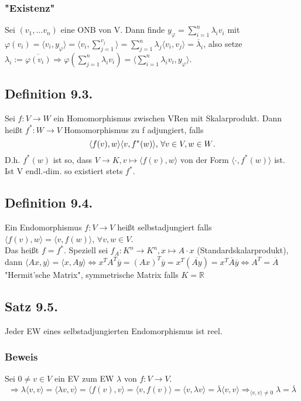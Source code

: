\documentclass[a4paper, 12pt]{extarticle}
\newcommand{\skalar}[2] {
	\langle #1, #2\rangle
}
\newcommand{\eskalar}[1]{
	\skalar{#1}{#1}
}
\newcommand{\gdw}{\Leftrightarrow}
\newcommand{\tn}[1]{\textnormal {#1}}
\begin{document}
\subsubsection*{"Existenz"}
Sei $(v_1,...v_n)$ eine ONB von V. Dann finde $y_\varphi=\sum_{i=1}^{n}\lambda_iv_i$ mit $\varphi(v_i)=\skalar{v_i}{y_\varphi} = \skalar{v_i}{\sum_{j=1}^{v_j}} = \sum_{j=1}^{n} \lambda_j \skalar{v_i}{v_j} = \overline\lambda_i$, also setze $\lambda_i := \overline{\varphi(v_i)} \Rightarrow \varphi(\sum_{j=1}^{n}\lambda_iv_i) = \skalar{\sum_{i=1}^{n}\lambda_iv_i}{y_\varphi}$.
\subsection*{Definition 9.3.}
Sei $f:V\to W$ ein Homomorphismus zwischen VRen mit Skalarprodukt. Dann heißt $f^*:W\to V$ Homomorphismus zu f adjungiert, falls 
$$\skalar{f(v)}{w} \skalar{v}{f^*(w)}\tn{, } \forall v\in V,w\in W\tn .$$
D.h. $f^*(w)$ ist so, dass $V\to K,v\mapsto \skalar{f(v)}{w}$ von der Form $\skalar{\cdot}{f^*(w)}$ ist. \\
Ist V endl.-dim. so existiert stets $f^*$.
\subsection*{Definition 9.4.}
Ein Endomorphismus $f:V\to V$ heißt selbstadjungiert falls $\skalar{f(v)}{w} = \skalar{v}{f(w)}$, $\forall v,w\in V$. \\
Das heißt $f=f^*$. Speziell sei $f_A:K^n\to K^n,x\mapsto A\cdot x$ (Standardskalarprodukt), dann $\skalar{Ax}{y} = \skalar{x}{Ay} \gdw x^TA^T\overline y = (Ax)^T\overline y = x^T(\overline{Ay}) = x^T\overline A\overline y \gdw A^T = \overline A$ "Hermit'sche Matrix", symmetrische Matrix falls $K=\mathbb R$
\subsection*{Satz 9.5.}
Jeder EW eines selbstadjungierten Endomorphismus ist reel.
\subsubsection*{Beweis}
Sei $0\neq v\in V$ ein EV zum EW $\lambda$ von $f:V\to V$.
$$\Rightarrow \lambda \eskalar{v} = \skalar{\lambda v}{v} = \skalar{f(v)}{v} = \skalar{v}{f(v)} = \skalar{v}{\lambda v} = \overline\lambda\eskalar{v} \Rightarrow_{\eskalar{v}\neq 0} \lambda = \overline\lambda$$
\end{document}
